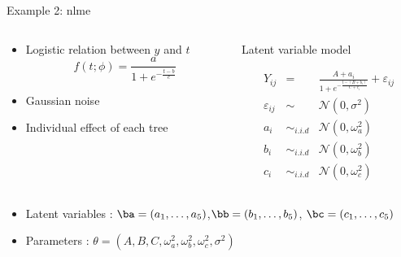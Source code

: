  
 \begin{frame}{Example 2: nlme}
 
  \begin{columns}[t]
 \begin{column}{0.50\linewidth} 
  \begin{block}{}
   \begin{itemize}
  \item Logistic relation between $y$ and $t$
  $$ f(t;\phi) = \frac{a}{1+e^{-\frac{t-b}{c}}}$$
  \item  Gaussian noise
  \item Individual effect of each tree
 \end{itemize}
   
  \end{block}
\end{column}

  \begin{column}{0.50\linewidth} 
  \begin{block}{Latent variable model}
 
\begin{eqnarray*}
Y_{ij} &=& \frac{A + a_{i}}{1+e^{-\frac{t-(B+b_i)}{C+c_i}}} + \varepsilon_{ij}\\
\varepsilon_{ij} &\sim& \mathcal{N}(0,\sigma^2)\\
a_i &\sim_{i.i.d}& \mathcal{N}(0, \omega^2_a)\\
b_i &\sim_{i.i.d}& \mathcal{N}(0, \omega^2_b)\\
c_i &\sim_{i.i.d}& \mathcal{N}(0, \omega^2_c)
\end{eqnarray*}
   \end{block}
   \vspace{1em}
   
\end{column}
\end{columns}
 
 
 \begin{itemize}
  \item {\vert Latent variables} : $\ba  =  (a_1,\dots,a_5)$,$\bb = (b_1,\dots,b_5)$, $\bc = (c_1,\dots,c_5)$
  \item {\vert Parameters} :  $\theta = (A,B,C,\omega^2_a,\omega^2_b,\omega^2_c,\sigma^2)$
 \end{itemize}

 \end{frame}

